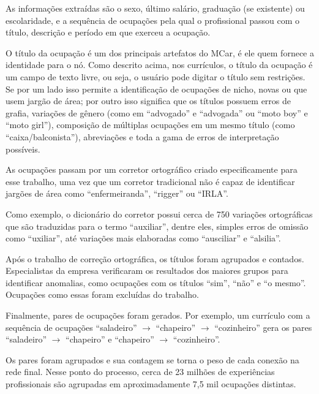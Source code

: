 \documentclass[
  article,
  11pt,
  a4paper,
  english,
  brazil,
  sumario=tradicional]{abntex2}
\begin{document}
As informações extraídas são o sexo, último salário, graduação (se existente) ou escolaridade, e a sequência de ocupações pela qual o profissional passou com o título, descrição e período em que exerceu a ocupação.

O título da ocupação é um dos principais artefatos do MCar, é ele quem fornece a identidade para o nó. Como descrito acima, nos currículos, o título da ocupação é um campo de texto livre, ou seja, o usuário pode digitar o título sem restrições. Se por um lado isso permite a identificação de ocupações de nicho, novas ou que usem jargão de área; por outro isso significa que os títulos possuem erros de grafia, variações de gênero (como em \enquote{advogado} e \enquote{advogada} ou \enquote{moto boy} e \enquote{moto girl}), composição de múltiplas ocupações em um mesmo título (como \enquote{caixa/balconista}), abreviações e toda a gama de erros de interpretação possíveis.

As ocupações passam por um corretor ortográfico criado especificamente para esse trabalho, uma vez que um corretor tradicional não é capaz de identificar jargões de área como \enquote{enfermeiranda}, \enquote{rigger} ou \enquote{IRLA}.

Como exemplo, o dicionário do corretor possui cerca de 750 variações ortográficas que são traduzidas para o termo \enquote{auxiliar}, dentre eles, simples erros de omissão como \enquote{uxiliar}, até variações mais elaboradas como \enquote{ausciliar} e \enquote{alsilia}.

Após o trabalho de correção ortográfica, os títulos foram agrupados e contados. Especialistas da empresa verificaram os resultados dos maiores grupos para identificar anomalias, como ocupações com os títulos \enquote{sim}, \enquote{não} e \enquote{o mesmo}. Ocupações como essas foram excluídas do trabalho.

Finalmente, pares de ocupações foram gerados. Por exemplo, um currículo com a sequência de ocupações \enquote{saladeiro} $\to$ \enquote{chapeiro} $\to$ \enquote{cozinheiro} gera os pares \enquote{saladeiro} $\to$ \enquote{chapeiro} e \enquote{chapeiro} $\to$ \enquote{cozinheiro}.

Os pares foram agrupados e sua contagem se torna o peso de cada conexão na rede final. Nesse ponto do processo, cerca de 23 milhões de experiências profissionais são agrupadas em aproximadamente 7,5 mil ocupações distintas.

\end{document}
